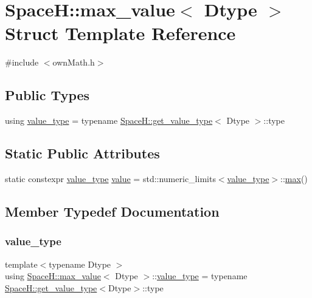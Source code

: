 \hypertarget{struct_space_h_1_1max__value}{}\section{SpaceH\+:\+:max\+\_\+value$<$ Dtype $>$ Struct Template Reference}
\label{struct_space_h_1_1max__value}


{\ttfamily \#include $<$own\+Math.\+h$>$}

\subsection*{Public Types}
\begin{DoxyCompactItemize}
\item 
using \mbox{\hyperlink{struct_space_h_1_1max__value_ae43b9c4bb300e03280887ef4144c40af}{value\+\_\+type}} = typename \mbox{\hyperlink{struct_space_h_1_1get__value__type}{Space\+H\+::get\+\_\+value\+\_\+type}}$<$ Dtype $>$\+::type
\end{DoxyCompactItemize}
\subsection*{Static Public Attributes}
\begin{DoxyCompactItemize}
\item 
static constexpr \mbox{\hyperlink{struct_space_h_1_1max__value_ae43b9c4bb300e03280887ef4144c40af}{value\+\_\+type}} \mbox{\hyperlink{struct_space_h_1_1max__value_af27ab405cbcf92a3e6213eb9ae5c97b6}{value}} = std\+::numeric\+\_\+limits$<$\mbox{\hyperlink{struct_space_h_1_1max__value_ae43b9c4bb300e03280887ef4144c40af}{value\+\_\+type}}$>$\+::\mbox{\hyperlink{namespace_space_h_aacd80a06ba9a8b2381301a3917d79cbe}{max}}()
\end{DoxyCompactItemize}


\subsection{Member Typedef Documentation}
\mbox{\label{struct_space_h_1_1max__value_ae43b9c4bb300e03280887ef4144c40af}} 
\subsubsection{\texorpdfstring{value\+\_\+type}{value\_type}}
{\footnotesize\ttfamily template$<$typename Dtype $>$ \\
using \mbox{\hyperlink{struct_space_h_1_1max__value}{Space\+H\+::max\+\_\+value}}$<$ Dtype $>$\+::\mbox{\hyperlink{struct_space_h_1_1max__value_ae43b9c4bb300e03280887ef4144c40af}{value\+\_\+type}} =  typename \mbox{\hyperlink{struct_space_h_1_1get__value__type}{Space\+H\+::get\+\_\+value\+\_\+type}}$<$Dtype$>$\+::type}



